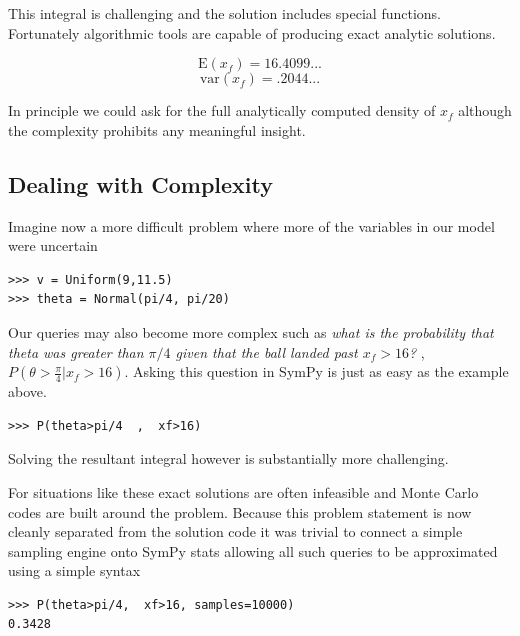 This integral is challenging and the solution includes special functions. Fortunately algorithmic tools are capable of producing exact analytic solutions. 

$$\textrm{E}(x_f) = 16.4099...$$
$$\textrm{var}(x_f) = .2044...$$

In principle we could ask for the full analytically computed density of $x_f$ although the complexity prohibits any meaningful insight. 

\subsection{Dealing with Complexity}

Imagine now a more difficult problem where more of the variables in our model were uncertain
\begin{lstlisting}
>>> v = Uniform(9,11.5)
>>> theta = Normal(pi/4, pi/20)
\end{lstlisting}

Our queries may also become more complex such as \textit{what is the probability that theta was greater than $\pi/4$ given that the ball landed past $x_f>16$?} , $P(\theta>\frac{\pi}{4} | x_f>16)$. Asking this question in SymPy is just as easy as the example above. 
\begin{lstlisting}
>>> P(theta>pi/4  ,  xf>16)
\end{lstlisting}
Solving the resultant integral however is substantially more challenging.

For situations like these exact solutions are often infeasible and Monte Carlo codes are built around the problem. Because this problem statement is now cleanly separated from the solution code it was trivial to connect a simple sampling engine onto SymPy stats allowing all such queries to be approximated using a simple syntax
\begin{lstlisting}
>>> P(theta>pi/4,  xf>16, samples=10000)
0.3428
\end{lstlisting}

